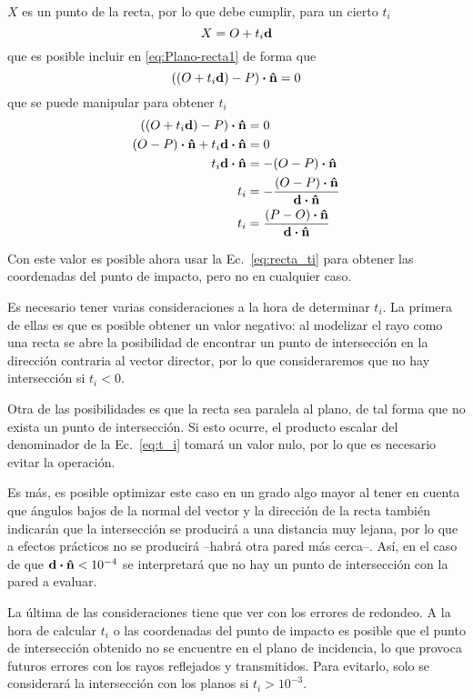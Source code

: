$X$ es un punto de la recta, por lo que debe cumplir, para un cierto $t_i$
\begin{equation}\label{eq:recta_ti}
    X = O + t_i\vb{d}
\end{equation}
que es posible incluir en \eqref{eq:Plano-recta1} de forma que
\begin{equation}
    ((O + t_i\vb{d})-P)\vdot\vu{n} = 0
\end{equation}
que se puede manipular para obtener $t_i$
\begin{equation}\label{eq:t_i}
    \begin{aligned}
        ((O + t_i\vb{d})-P)\vdot\vu{n} &= 0 \\
        (O - P)\vdot\vu{n} + t_i\vb{d}\vdot\vu{n}  &= 0 \\
        t_i\vb{d}\vdot\vu{n} &= - (O - P)\vdot\vu{n}\\
        t_i &= -\frac{(O - P)\vdot\vu{n}}{\vb{d}\vdot\vu{n}}\\
        t_i &= \frac{(P-O)\vdot\vu{n}}{\vb{d}\vdot\vu{n}}
    \end{aligned}
\end{equation}

Con este valor es posible ahora usar la Ec.~\eqref{eq:recta_ti} para obtener las coordenadas del punto de impacto, pero no en cualquier caso.

Es necesario tener varias consideraciones a la hora de determinar $t_i$.
La primera de ellas es que es posible obtener un valor negativo: al modelizar el rayo como una recta se abre la posibilidad de encontrar un punto de intersección en la dirección contraria al vector director, por lo que consideraremos que no hay intersección si $t_i < 0$.

Otra de las posibilidades es que la recta sea paralela al plano, de tal forma que no exista un punto de intersección.
Si esto ocurre, el producto escalar del denominador de la Ec.~\ref{eq:t_i} tomará un valor nulo, por lo que es necesario evitar la operación.

Es más, es posible optimizar este caso en un grado algo mayor al tener en cuenta que ángulos bajos de la normal del vector y la dirección de la recta también indicarán que la intersección se producirá a una distancia muy lejana, por lo que a efectos prácticos no se producirá --habrá otra pared más cerca--.
Así, en el caso de que $\vb{d}\vdot\vu{n} < 10^{-4}$ se interpretará que no hay un punto de intersección con la pared a evaluar.

La última de las consideraciones tiene que ver con los errores de redondeo.
A la hora de calcular $t_i$ o las coordenadas del punto de impacto es posible que el punto de intersección obtenido no se encuentre en el plano de incidencia, lo que provoca futuros errores con los rayos reflejados y transmitidos.
Para evitarlo, solo se considerará la intersección con los planos si $t_i > 10^{-3}$.

